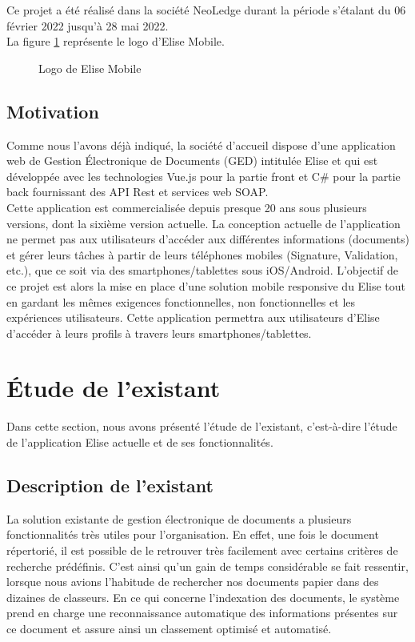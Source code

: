 Ce projet a été réalisé dans la société NeoLedge durant la période s'étalant du 06 février 2022 jusqu'à 28 mai 2022.\\

La figure \ref{fig:logoEliseMobile} représente le logo d'Elise Mobile.\\

\begin{figure}
\centering
{}
\caption{Logo de Elise Mobile}
\label{fig:logoEliseMobile}
\end{figure}

\subsection{Motivation}
Comme nous l'avons déjà indiqué, la société d'accueil dispose d'une application web de Gestion Électronique de Documents (GED) intitulée Elise et qui est développée avec les technologies Vue.js pour la partie front et C\# pour la partie back fournissant des API Rest et services web SOAP.\\
Cette application est commercialisée depuis presque 20 ans sous plusieurs versions, dont la sixième version actuelle. La conception actuelle de l'application ne permet pas aux utilisateurs d'accéder aux différentes informations (documents) et gérer leurs tâches à partir de leurs téléphones mobiles (Signature, Validation, etc.), que ce soit via des smartphones/tablettes sous iOS/Android.
L'objectif de ce projet est alors la mise en place d'une solution mobile responsive du Elise tout en gardant les mêmes exigences fonctionnelles, non fonctionnelles et les expériences utilisateurs. Cette application permettra aux utilisateurs d'Elise d'accéder à leurs profils à travers leurs smartphones/tablettes.

\section{Étude de l'existant}
Dans cette section, nous avons présenté l'étude de l'existant, c'est-à-dire l'étude de l'application Elise actuelle et de ses fonctionnalités.
\subsection{Description de l'existant}
La solution existante de gestion électronique de documents a plusieurs fonctionnalités très utiles pour l'organisation. En effet, une fois le document répertorié, il est possible de le retrouver très facilement avec certains critères de recherche prédéfinis. C'est ainsi qu'un gain de temps considérable se fait ressentir, lorsque nous avions l'habitude de rechercher nos documents papier dans des dizaines de classeurs. En ce qui concerne l'indexation des documents, le système prend en charge une reconnaissance automatique des informations présentes sur ce document et assure ainsi un classement optimisé et automatisé.

